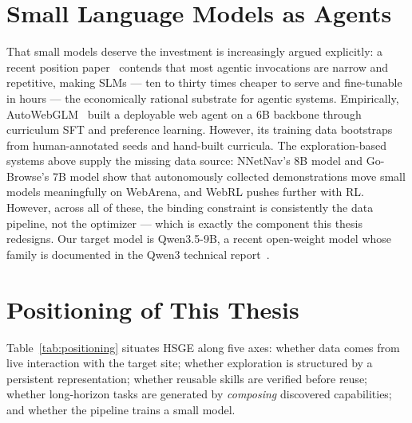 \section{Small Language Models as Agents}
\label{sec:rel-slm}

That small models deserve the investment is increasingly argued explicitly: a
recent position paper~\cite{belcak2025slm} contends that most agentic
invocations are narrow and repetitive, making SLMs --- ten to thirty times
cheaper to serve and fine-tunable in hours --- the economically rational
substrate for agentic systems.
Empirically, AutoWebGLM~\cite{lai2024autowebglm} built a deployable web agent
on a 6B backbone through curriculum SFT and preference learning. However, its
training data bootstraps from human-annotated seeds and hand-built
curricula. The exploration-based systems above supply the missing data
source: NNetNav's 8B model and Go-Browse's 7B model show that autonomously
collected demonstrations move small models meaningfully on WebArena, and
WebRL pushes further with RL. However, across all of these, the binding
constraint is consistently the data pipeline, not the optimizer --- which is
exactly the component this thesis redesigns. Our target model is
Qwen3.5-9B, a recent open-weight model whose family is documented in the
Qwen3 technical report~\cite{yang2025qwen3}.

\section{Positioning of This Thesis}
\label{sec:rel-positioning}

Table~\ref{tab:positioning} situates HSGE along five axes: whether data
comes from live interaction with the target site; whether exploration is
structured by a persistent representation; whether reusable skills are
verified before reuse; whether long-horizon tasks are generated by
\emph{composing} discovered capabilities; and whether the pipeline trains a
small model.


